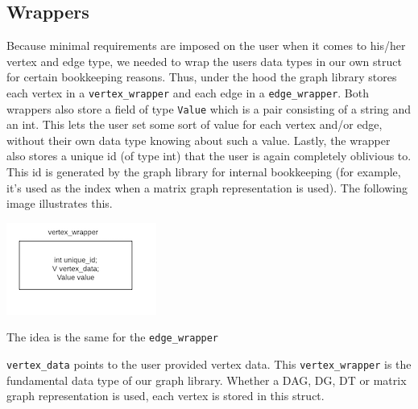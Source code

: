 \documentclass{article}
\begin{document}
\subsection{Wrappers}
Because minimal requirements are imposed on the user when it comes to his/her vertex and edge type, we needed to wrap the users data types in our own struct for certain bookkeeping reasons. Thus, under the hood the graph library stores each vertex in a \texttt{vertex\_wrapper} and each edge in a \texttt{edge\_wrapper}. Both wrappers also store a field of type \texttt{Value} which is a pair consisting of a string and an int. This lets the user set some sort of value for each vertex and/or edge, without their own data type knowing about such a value. Lastly, the wrapper also stores a unique id (of type int) that the user is again completely oblivious to. This id is generated by the graph library for internal bookkeeping (for example, it's used as the index when a matrix graph representation is used). The following image illustrates this.

\includegraphics{vertexwrapper}

The idea is the same for the \texttt{edge\_wrapper}

\texttt{vertex\_data} points to the user provided vertex data. This \texttt{vertex\_wrapper} is the fundamental data type of our graph library. Whether a DAG, DG, DT or matrix graph representation is used, each vertex is stored in this struct. 
\end{document}
